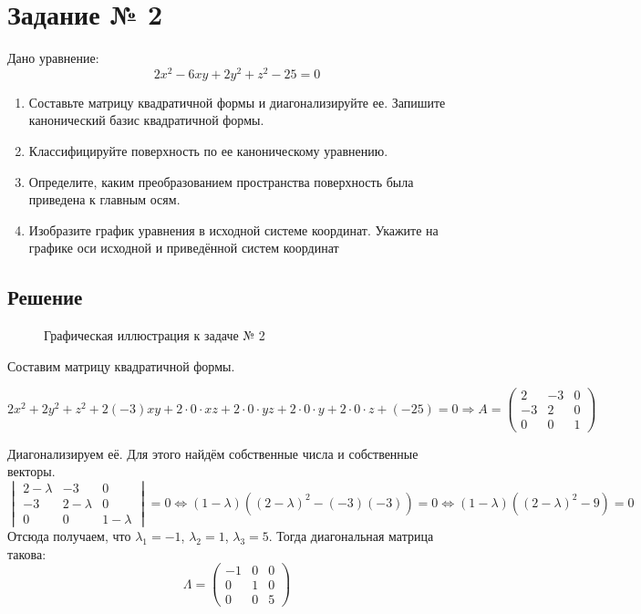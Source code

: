\section{Задание № 2}

Дано уравнение:
\[2x^2 - 6xy + 2y^2 + z^2 - 25 = 0\]

\begin{enumerate}
  \item Составьте матрицу квадратичной формы и диагонализируйте ее.
    Запишите канонический базис квадратичной формы.
  \item Классифицируйте поверхность по ее каноническому уравнению.
  \item Определите, каким преобразованием пространства поверхность была
    приведена к главным осям.
  \item Изобразите график уравнения в исходной системе координат.
    Укажите на графике оси исходной и приведённой систем координат
\end{enumerate}

\subsection{Решение}

\begin{figure}[htbp]
  \centering
  \caption{Графическая иллюстрация к задаче № 2} \label{fig:2}
\end{figure}


Составим матрицу квадратичной формы.

\[
  2x^2 + 2y^2 + z^2
  + 2 (-3) xy + 2 \cdot 0 \cdot xz + 2 \cdot 0 \cdot yz
  + 2 \cdot 0 \cdot y + 2 \cdot 0 \cdot z + (-25) = 0
  \Rightarrow
  A =
  \begin{pmatrix}
    2 & -3 & 0 \\
    -3 & 2 & 0 \\
    0 & 0 & 1
  \end{pmatrix}
\]

Диагонализируем её. Для этого найдём собственные числа
и собственные векторы.
\[
  \begin{vmatrix}
    2 - λ & -3 & 0 \\
    -3 & 2 - λ & 0 \\
    0 & 0 & 1 - λ
  \end{vmatrix}
  = 0
  \Leftrightarrow
  (1 - λ) ({(2 - λ)}^2 - (-3) (-3)) = 0
  \Leftrightarrow
  (1 - λ) ({(2 - λ)}^2 - 9) = 0
\]
Отсюда получаем, что
\(λ_1 = -1\),
\(λ_2 = 1\),
\(λ_3 = 5\).
Тогда диагональная матрица такова:
\[
  Λ =
  \begin{pmatrix}
    -1 & 0 & 0 \\
    0 & 1 & 0 \\
    0 & 0 & 5
  \end{pmatrix}
\]

